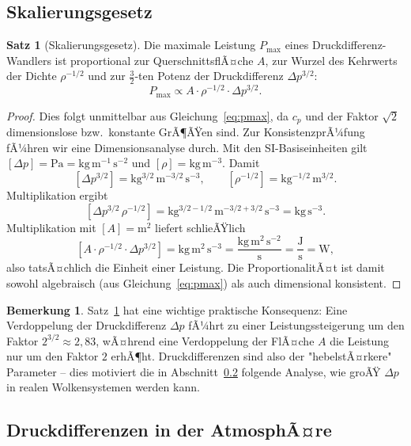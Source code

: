 ﻿\documentclass[a4paper,12pt]{article}
\theoremstyle{definition}
\newtheorem{satz}{Satz}
\newtheorem{bemerkung}{Bemerkung}
\begin{document}
\subsection{Skalierungsgesetz}

\begin{satz}[Skalierungsgesetz]
	\label{satz:skalierung}
	Die maximale Leistung $P_{\max}$ eines Druckdifferenz-Wandlers ist
	proportional zur QuerschnittsflÃ¤che $A$, zur Wurzel des Kehrwerts
	der Dichte $\rho^{-1/2}$ und zur $\tfrac{3}{2}$-ten Potenz der
	Druckdifferenz $\Delta p^{3/2}$:
	\[
		P_{\max} \propto A \cdot \rho^{-1/2} \cdot \Delta p^{3/2}.
	\]
\end{satz}

\begin{proof}
	Dies folgt unmittelbar aus Gleichung~\eqref{eq:pmax}, da $c_p$ und
	der Faktor $\sqrt{2}$ dimensionslose bzw.\ konstante GrÃ¶ÃŸen sind.
	Zur KonsistenzprÃ¼fung fÃ¼hren wir eine Dimensionsanalyse durch.
	Mit den SI-Basiseinheiten gilt $[\Delta p] = \mathrm{Pa} =
	\mathrm{kg\,m^{-1}\,s^{-2}}$ und $[\rho] = \mathrm{kg\,m^{-3}}$.
	Damit
	\[
		\left[\Delta p^{3/2}\right]
		= \mathrm{kg^{3/2}\,m^{-3/2}\,s^{-3}},
		\qquad
		\left[\rho^{-1/2}\right]
		= \mathrm{kg^{-1/2}\,m^{3/2}}.
	\]
	Multiplikation ergibt
	\[
		\left[\Delta p^{3/2}\,\rho^{-1/2}\right]
		= \mathrm{kg^{3/2-1/2}\,m^{-3/2+3/2}\,s^{-3}}
		= \mathrm{kg\,s^{-3}}.
	\]
	Multiplikation mit $[A] = \mathrm{m^2}$ liefert schlieÃŸlich
	\[
		\left[A \cdot \rho^{-1/2} \cdot \Delta p^{3/2}\right]
		= \mathrm{kg\,m^2\,s^{-3}}
		= \frac{\mathrm{kg\,m^2\,s^{-2}}}{\mathrm{s}}
		= \frac{\mathrm{J}}{\mathrm{s}}
		= \mathrm{W},
	\]
	also tatsÃ¤chlich die Einheit einer Leistung. Die ProportionalitÃ¤t ist
	damit sowohl algebraisch (aus Gleichung~\eqref{eq:pmax}) als auch
	dimensional konsistent.
\end{proof}

\begin{bemerkung}
	Satz~\ref{satz:skalierung} hat eine wichtige praktische Konsequenz:
	Eine Verdoppelung der Druckdifferenz $\Delta p$ fÃ¼hrt zu einer
	Leistungssteigerung um den Faktor $2^{3/2} \approx 2{,}83$, wÃ¤hrend
	eine Verdoppelung der FlÃ¤che $A$ die Leistung nur um den Faktor $2$
	erhÃ¶ht. Druckdifferenzen sind also der "hebelstÃ¤rkere" Parameter --
	dies motiviert die in Abschnitt~\ref{sec:atmosphaere} folgende
	Analyse, wie groÃŸ $\Delta p$ in realen Wolkensystemen werden kann.
\end{bemerkung}

\subsection{Druckdifferenzen in der AtmosphÃ¤re}
\label{sec:atmosphaere}
\end{document}
